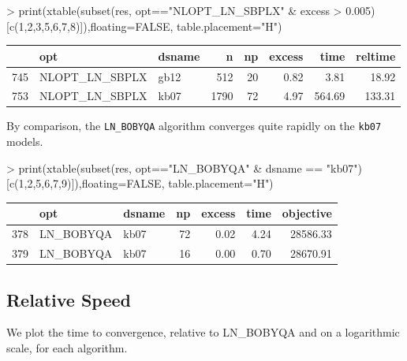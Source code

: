 \documentclass[article]{jss}
\begin{document}
\begin{Schunk}
\begin{Sinput}
> print(xtable(subset(res, opt=="NLOPT_LN_SBPLX" & excess > 0.005)[c(1,2,3,5,6,7,8)]),floating=FALSE, table.placement="H")
\end{Sinput}
\begin{tabular}{rllrrrrr}
  \hline
 & opt & dsname & n & np & excess & time & reltime \\ 
  \hline
745 & NLOPT\_LN\_SBPLX & gb12 & 512 &  20 & 0.82 & 3.81 & 18.92 \\ 
  753 & NLOPT\_LN\_SBPLX & kb07 & 1790 &  72 & 4.97 & 564.69 & 133.31 \\ 
   \hline
\end{tabular}\end{Schunk}

  
    By comparison, the \texttt{LN\_BOBYQA} algorithm converges quite rapidly
on the \texttt{kb07} models.

        
        
        
\begin{Schunk}
\begin{Sinput}
> print(xtable(subset(res, opt=="LN_BOBYQA" & dsname == "kb07")[c(1,2,5,6,7,9)]),floating=FALSE, table.placement="H")
\end{Sinput}
\begin{tabular}{rllrrrr}
  \hline
 & opt & dsname & np & excess & time & objective \\ 
  \hline
378 & LN\_BOBYQA & kb07 &  72 & 0.02 & 4.24 & 28586.33 \\ 
  379 & LN\_BOBYQA & kb07 &  16 & 0.00 & 0.70 & 28670.91 \\ 
   \hline
\end{tabular}\end{Schunk}

\subsection[Relative Speed]{Relative Speed}

We plot the time to convergence, relative to LN_BOBYQA and on a logarithmic scale, for each algorithm.
\end{document}
